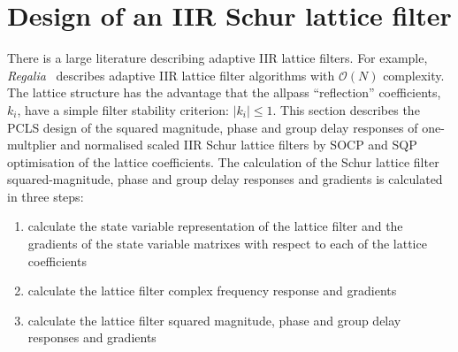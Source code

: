 \documentclass[a4paper,twoside,10pt,english]{report}
\begin{document}
\section{\label{sec:Design-of-IIR-Schur-lattice-filters}Design of an IIR Schur lattice filter}
There is a large literature describing adaptive IIR lattice filters. For example,
\emph{Regalia}~\cite{Regalia_StableLatticeAdaptiveIIR} describes adaptive
IIR lattice filter algorithms with $\mathcal{O}\left(N\right)$ complexity.
The lattice structure has the advantage that the allpass
``reflection'' coefficients, $k_{i}$, have a simple filter stability
criterion: $\left|k_{i}\right|\le{}1$. This section describes the PCLS
design of the squared magnitude, phase and group delay responses of 
one-multplier and normalised scaled IIR Schur lattice filters by SOCP and SQP 
optimisation of the lattice coefficients. The calculation of the Schur lattice
filter squared-magnitude, phase and group delay responses and gradients is
calculated in three steps:
\begin{enumerate}
\item calculate the state variable representation of the lattice filter and the 
gradients of the state variable matrixes with respect to each of the lattice 
coefficients
\item calculate the lattice filter complex frequency response and gradients
\item calculate the lattice filter squared magnitude, phase and group delay responses and gradients 
\end{enumerate}
\end{document}
